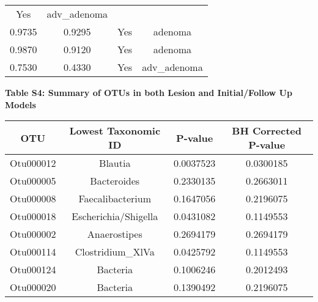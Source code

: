 \documentclass[12pt,]{article}
\begin{document}
\begin{longtable}[]{@{}cccc@{}}
\begin{minipage}[t]{0.22\columnwidth}
Yes\strut
\end{minipage} & \begin{minipage}[t]{0.16\columnwidth}\centering\strut
adv\_adenoma\strut
\end{minipage}\tabularnewline
\begin{minipage}[t]{0.24\columnwidth}\centering\strut
0.9735\strut
\end{minipage} & \begin{minipage}[t]{0.26\columnwidth}\centering\strut
0.9295\strut
\end{minipage} & \begin{minipage}[t]{0.22\columnwidth}\centering\strut
Yes\strut
\end{minipage} & \begin{minipage}[t]{0.16\columnwidth}\centering\strut
adenoma\strut
\end{minipage}\tabularnewline
\begin{minipage}[t]{0.24\columnwidth}\centering\strut
0.9870\strut
\end{minipage} & \begin{minipage}[t]{0.26\columnwidth}\centering\strut
0.9120\strut
\end{minipage} & \begin{minipage}[t]{0.22\columnwidth}\centering\strut
Yes\strut
\end{minipage} & \begin{minipage}[t]{0.16\columnwidth}\centering\strut
adenoma\strut
\end{minipage}\tabularnewline
\begin{minipage}[t]{0.24\columnwidth}\centering\strut
0.7530\strut
\end{minipage} & \begin{minipage}[t]{0.26\columnwidth}\centering\strut
0.4330\strut
\end{minipage} & \begin{minipage}[t]{0.22\columnwidth}\centering\strut
Yes\strut
\end{minipage} & \begin{minipage}[t]{0.16\columnwidth}\centering\strut
adv\_adenoma\strut
\end{minipage}\tabularnewline
\bottomrule
\end{longtable}

\newpage

\textbf{Table S4: Summary of OTUs in both Lesion and Initial/Follow Up
Models}

\begin{longtable}[]{@{}cccc@{}}
\toprule
OTU & Lowest Taxonomic ID & P-value & BH Corrected
P-value\tabularnewline
\midrule
\endhead
Otu000012 & Blautia & 0.0037523 & 0.0300185\tabularnewline
Otu000005 & Bacteroides & 0.2330135 & 0.2663011\tabularnewline
Otu000008 & Faecalibacterium & 0.1647056 & 0.2196075\tabularnewline
Otu000018 & Escherichia/Shigella & 0.0431082 & 0.1149553\tabularnewline
Otu000002 & Anaerostipes & 0.2694179 & 0.2694179\tabularnewline
Otu000114 & Clostridium\_XlVa & 0.0425792 & 0.1149553\tabularnewline
Otu000124 & Bacteria & 0.1006246 & 0.2012493\tabularnewline
Otu000020 & Bacteria & 0.1390492 & 0.2196075\tabularnewline
\bottomrule
\end{longtable}
\end{document}

